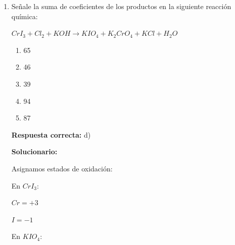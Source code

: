 \begin{enumerate}[resume]
	\textbf{Respuesta correcta:} a)

	\vspace{2mm}
	\textbf{Solucionario:}

	\textbf{Datos}

	$M_{CaO} = ?$

	Pureza $CaCO_3 = 62\%$

	1 Tonelada = $1,000 \, kg$

	$ PM \, CaCO_3 = 100$

	$PM \, CaO = 56$

	Si la caliza tiene una pureza de $62\%$, entonces:\\
	$CaCO_3 = 1,000 \, kg \times 62\%$\\
	$CaCO_3 = 620 \, kg$ puro\\

	$\Rightarrow \quad CaCO_3 \xrightarrow{\hspace{1cm}} CaO$\\
	\phantom{$\Rightarrow \quad$} $100 \xrightarrow{\hspace{1cm}} 56$\\
	\phantom{$\Rightarrow \quad$} $620 \xrightarrow{\hspace{1cm}} X$\\

	$X = \dfrac{(620)(56)}{100}$\\



	\item Señale la suma de coeficientes de los productos en la siguiente reacción química:

	$CrI_3 + Cl_2 + KOH \rightarrow KIO_4 + K_2CrO_4 + KCl + H_2O$

	\begin{enumerate}[label=\alph*)]
		\item 65
		\item 46
		\item 39
		\item 94
		\item 87
	\end{enumerate}
	\textbf{Respuesta correcta:} d)

	\vspace{2mm}
	\textbf{Solucionario:}

	Asignamos estados de oxidación:

	En $CrI_3$:

	$Cr=+3$

	$I=-1$

	En $KIO_4$:


\end{enumerate}
